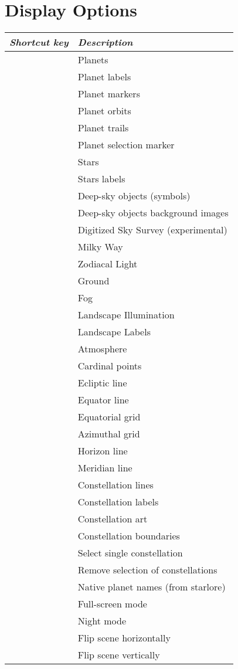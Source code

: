 \section{Display Options}
\label{ch:Hotkeys:DisplayOptions}
\begin{longtabu} to \textwidth {rl}\toprule
\emph{Shortcut key}	& \emph{Description}\\\midrule
{} 			& Planets \\
 		& Planet labels \\
		& Planet markers \\
 			& Planet orbits \\
		& Planet trails \\
 & Planet selection marker \\
 			& Stars \\
			& Stars labels \\
				& Deep-sky objects (symbols)\\
				& Deep-sky objects background images \\
   & Digitized Sky Survey (experimental) \\
 			& Milky Way \\
	& Zodiacal Light \\
 			& Ground \\
 			& Fog \\
		& Landscape Illumination \\
	& Landscape Labels \\
				& Atmosphere \\
%
				& Cardinal points \\
\key{,} 			& Ecliptic line \\
				& Equator line \\
 			& Equatorial grid \\
				& Azimuthal grid \\
 			& Horizon line \\
\key{;} 			& Meridian line \\
%
				& Constellation lines \\
				& Constellation labels \\
				& Constellation art \\
				& Constellation boundaries \\
	& Select single constellation \\
	        & Remove selection of constellations \\
	& Native planet names (from starlore) \\
%
 			& Full-screen mode \\
 		& Night mode \\
	& Flip scene horizontally \\
	& Flip scene vertically \\
\bottomrule
\end{longtabu}


